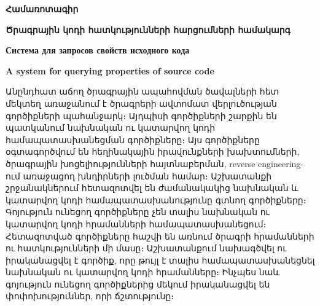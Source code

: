 {
	\thispagestyle{plain}
	\begin{center}
	    \large
	    \textbf{Համառոտագիր}
	\end{center}
	
	\begin{flushleft}
		\vspace{0.5cm}
		
		\large
		\textbf{Ծրագրային կոդի հատկությունների հարցումների համակարգ}
		
		\vspace{0.2cm}
		\textbf{Система для запросов свойств исходного кода}
		
		\vspace{0.2cm}
		\textbf{A system for querying properties of source code}
		
		\vspace{0.5cm}
		
	\end{flushleft}
	Անընդհատ աճող ծրագրային ապահովման ծավալների հետ մեկտեղ առաջանում է ծրագրերի ավտոմատ վերլուծության գործիքների պահանջարկ։ Այդպիսի գործիքների շարքին են պատկանում նախնական ու կատարվող կոդի համապատասխանեցման գործիքները։ Այս գործիքները օգտագործվում են հեղինակային իրավունքների խախտումների, ծրագրային խոցելիությունների հայտնաբերման, reverse engineering-ում առաջացող խնդիրների լուծման համար։ Աշխատանքի շրջանակներում հետազոտվել են ժամանակակից նախնական և կատարվող կոդի համապատասխանությունը գտնող գործիքները։ Գոյություն ունեցող գործիքները չեն տալիս նախնական ու կատարվող կոդի հրամանների համապատասխանեցում։ Հետազոտված գործիքները հաշվի են առնում ծրագրի հրամանների ու հատկությունների մի մասը։ Աշխատանքում նախագծվել ու իրականացվել է գործիք, որը թույլ է տալիս համապատասխանեցնել նախնական ու կատարվող կոդի հրամանները։ Ինչպես նաև գոյություն ունեցող գործիքներից մեկում իրականացվել են փոփոխություններ, որի ճշտությունը։
}